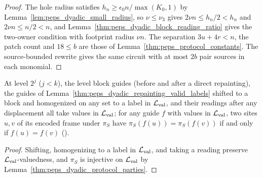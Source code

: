 \begin{proof}\leanok
    The hole radius satisfies $h_n\ge\epsilon_0n/\max(K_0,1)$ by
    Lemma~\ref{lem:peps_dyadic_small_radius}, so $\nu\le\nu_3$ gives
    $2\nu n\le h_n/2<h_n$ and $2\nu n\le n/2<n$, and
    Lemma~\ref{thm:peps_dyadic_block_reading_ratio} gives the two-owner
    condition with footprint radius $\nu n$. The
    separation $3u+4r<n$, the patch count and $18\le b$ are those of
    Lemma~\ref{thm:peps_protocol_constants}.
    The source-bounded rewrite gives the same circuit with at most $2b$ pair sources
    in each monomial.
\end{proof}

\begin{lemma}
    \label{thm:peps_dyadic_guide_owners}
    \leanok
    At level $2^j$ ($j<k$), the level block guides (before and after a direct
    repainting), the guides of Lemma~\ref{thm:peps_dyadic_repainting_valid_labels}
    shifted to a block and homogenized on any set to a label in
    $\mathcal L_{\rm val}$, and their readings after any displacement all take
    values in $\mathcal L_{\rm val}$; for any guide $f$ with values in
    $\mathcal L_{\rm val}$, two sites $u,v$ of its encoded frame under $\pi_S$
    have $\pi_S(f(u))=\pi_S(f(v))$ if and only if $f(u)=f(v)$
    (\cite[\texttt{06-geometry.tex}, lines 82--100, 328--339, 507--527]{OpenAI2026PolynomialPEPS}).
\end{lemma}

\begin{proof}\leanok
    Shifting, homogenizing to a label in $\mathcal L_{\rm val}$, and taking a
    reading preserve $\mathcal L_{\rm val}$-valuedness, and $\pi_S$ is injective on
    $\mathcal L_{\rm val}$ by Lemma~\ref{thm:peps_dyadic_protocol_parties}.
\end{proof}
